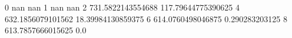 0 nan nan
1 nan nan
2 731.5822143554688 117.79644775390625
4 632.1856079101562 18.39984130859375
6 614.0760498046875 0.290283203125
8 613.7857666015625 0.0
